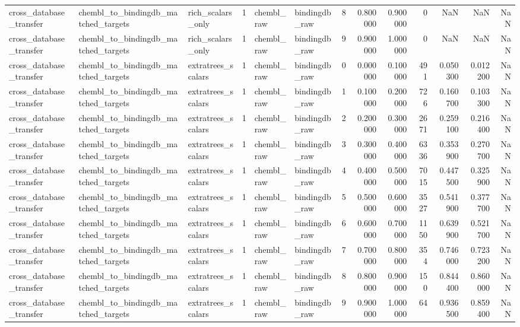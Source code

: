 \begin{longtable}{lllrllrrrrrrr}
cross\_database\_transfer & chembl\_to\_bindingdb\_matched\_targets & rich\_scalars\_only & 1 & chembl\_raw & bindingdb\_raw & 8 & 0.800000 & 0.900000 & 0 & NaN & NaN & NaN \\
cross\_database\_transfer & chembl\_to\_bindingdb\_matched\_targets & rich\_scalars\_only & 1 & chembl\_raw & bindingdb\_raw & 9 & 0.900000 & 1.000000 & 0 & NaN & NaN & NaN \\
cross\_database\_transfer & chembl\_to\_bindingdb\_matched\_targets & extratrees\_scalars & 1 & chembl\_raw & bindingdb\_raw & 0 & 0.000000 & 0.100000 & 491 & 0.050300 & 0.012200 & NaN \\
cross\_database\_transfer & chembl\_to\_bindingdb\_matched\_targets & extratrees\_scalars & 1 & chembl\_raw & bindingdb\_raw & 1 & 0.100000 & 0.200000 & 726 & 0.160700 & 0.103300 & NaN \\
cross\_database\_transfer & chembl\_to\_bindingdb\_matched\_targets & extratrees\_scalars & 1 & chembl\_raw & bindingdb\_raw & 2 & 0.200000 & 0.300000 & 2671 & 0.259100 & 0.216400 & NaN \\
cross\_database\_transfer & chembl\_to\_bindingdb\_matched\_targets & extratrees\_scalars & 1 & chembl\_raw & bindingdb\_raw & 3 & 0.300000 & 0.400000 & 6336 & 0.353900 & 0.270700 & NaN \\
cross\_database\_transfer & chembl\_to\_bindingdb\_matched\_targets & extratrees\_scalars & 1 & chembl\_raw & bindingdb\_raw & 4 & 0.400000 & 0.500000 & 7015 & 0.447500 & 0.325900 & NaN \\
cross\_database\_transfer & chembl\_to\_bindingdb\_matched\_targets & extratrees\_scalars & 1 & chembl\_raw & bindingdb\_raw & 5 & 0.500000 & 0.600000 & 3527 & 0.541900 & 0.377700 & NaN \\
cross\_database\_transfer & chembl\_to\_bindingdb\_matched\_targets & extratrees\_scalars & 1 & chembl\_raw & bindingdb\_raw & 6 & 0.600000 & 0.700000 & 1150 & 0.639900 & 0.521700 & NaN \\
cross\_database\_transfer & chembl\_to\_bindingdb\_matched\_targets & extratrees\_scalars & 1 & chembl\_raw & bindingdb\_raw & 7 & 0.700000 & 0.800000 & 354 & 0.746000 & 0.723200 & NaN \\
cross\_database\_transfer & chembl\_to\_bindingdb\_matched\_targets & extratrees\_scalars & 1 & chembl\_raw & bindingdb\_raw & 8 & 0.800000 & 0.900000 & 150 & 0.844400 & 0.860000 & NaN \\
cross\_database\_transfer & chembl\_to\_bindingdb\_matched\_targets & extratrees\_scalars & 1 & chembl\_raw & bindingdb\_raw & 9 & 0.900000 & 1.000000 & 64 & 0.936500 & 0.859400 & NaN \\

\end{longtable}
